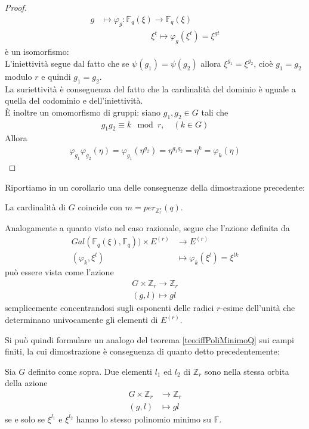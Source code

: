 \begin{proof}
\begin{align*}
			      g &\longmapsto  \varphi_{g} : \mathbb{F}_{q}(\xi)\longrightarrow  \mathbb{F}_{q}(\xi)\\
					  & \quad \qquad \qquad \quad \xi^{t} \longmapsto \varphi_{g}(\xi^{t}) = \xi^{gt}
      \end{align*}
   è un isomorfismo:\\
   L'iniettività segue dal fatto che se $\psi(g_{1})=\psi(g_{2})$ allora $\xi^{g_{1}} = \xi^{g_{2}}$, cioè $g_{1} = g_{2}$ modulo $r$ e quindi $g_{1} = g_{2}$.\\
   La suriettività è conseguenza del fatto che la cardinalità del dominio è uguale a quella del codominio e dell'iniettività.\\
   È inoltre un omomorfismo di gruppi: siano $g_{1}, g_{2} \in G$ tali che 
   \begin{align*}
      g_{1} g_{2} \equiv k \mod{r}, \quad (k \in G)
   \end{align*}
   Allora 
   \begin{align*}
      \varphi_{g_{1}} \varphi_{g_{2}}(\eta) = \varphi_{g_{1}}(\eta^{g_{2}}) = \eta^{g_{1}g_{2}} = \eta^{k} = \varphi_{k}(\eta) 
   \end{align*}
\end{proof}
\noindent
Riportiamo in un corollario una delle conseguenze della dimostrazione precedente:
\begin{corollario}
   La cardinalità di $G$ coincide con $m = per_{\mathbb{Z}_{r}^{\star}}(q)$.
\end{corollario}

Analogamente a quanto visto nel caso razionale, segue che l'azione definita da
\begin{align*}
 Gal(\mathbb{F}_{q}(\xi), \mathbb{F}_{q})) \times E^{(r)}  & \longrightarrow  E^{(r)}   \\
           (\varphi_{k},\xi^{l}) & \longmapsto \varphi_{k}(\xi^{l}) = \xi^{lk}
\end{align*}
può essere vista come l'azione
\begin{align*}
 G \times \mathbb{Z}_{r} \longrightarrow  \mathbb{Z}_{r}   \\
           (g,l) \longmapsto gl
\end{align*}
semplicemente concentrandosi sugli esponenti delle radici $r$-esime dell'unità che determinano univocamente gli elementi di $E^{(r)}$.

Si può quindi formulare un analogo del teorema \ref{teo:iffPoliMinimoQ} sui campi finiti, la cui dimostrazione è conseguenza di quanto detto precedentemente: 
\begin{teorema} \label{teo:iffPoliMinimoGF}
Sia $G$ definito come sopra. Due elementi $l_{1}$ ed $l_{2}$ di $\mathbb{Z}_{r}$ sono nella stessa orbita della azione 
\begin{align*}
 G \times \mathbb{Z}_{r} &\longrightarrow  \mathbb{Z}_{r}   \\
           (g,l) &\longmapsto gl
\end{align*}
se e solo se $\xi^{l_{1}}$ e $\xi^{l_{2}}$ hanno lo stesso polinomio minimo su $\mathbb{F}$.
\end{teorema}


